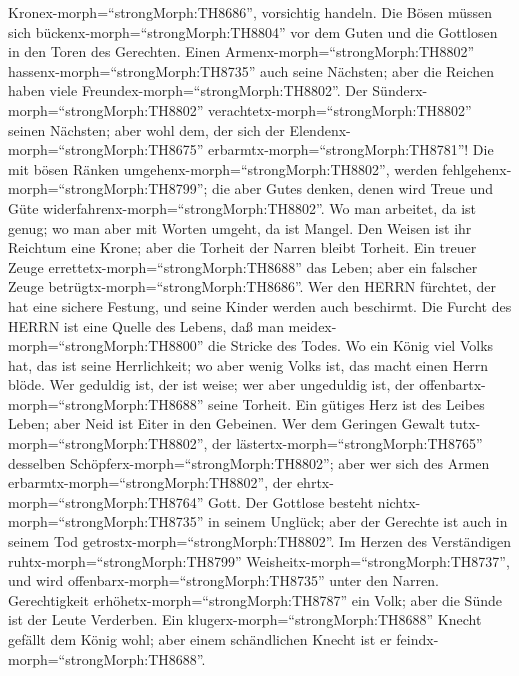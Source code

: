 Kronex-morph=``strongMorph:TH8686'', vorsichtig handeln. 
Die Bösen müssen sich bückenx-morph=``strongMorph:TH8804'' vor dem Guten
und die Gottlosen in den Toren des Gerechten.  Einen
Armenx-morph=``strongMorph:TH8802'' hassenx-morph=``strongMorph:TH8735''
auch seine Nächsten; aber die Reichen haben viele
Freundex-morph=``strongMorph:TH8802''.  Der
Sünderx-morph=``strongMorph:TH8802''
verachtetx-morph=``strongMorph:TH8802'' seinen Nächsten; aber wohl dem,
der sich der Elendenx-morph=``strongMorph:TH8675''
erbarmtx-morph=``strongMorph:TH8781''!  Die mit bösen
Ränken umgehenx-morph=``strongMorph:TH8802'', werden
fehlgehenx-morph=``strongMorph:TH8799''; die aber Gutes denken, denen
wird Treue und Güte widerfahrenx-morph=``strongMorph:TH8802''.
 Wo man arbeitet, da ist genug; wo man aber mit Worten
umgeht, da ist Mangel.  Den Weisen ist ihr Reichtum eine
Krone; aber die Torheit der Narren bleibt Torheit.  Ein
treuer Zeuge errettetx-morph=``strongMorph:TH8688'' das Leben; aber ein
falscher Zeuge betrügtx-morph=``strongMorph:TH8686''.  Wer
den HERRN fürchtet, der hat eine sichere Festung, und seine Kinder
werden auch beschirmt.  Die Furcht des HERRN ist eine
Quelle des Lebens, daß man meidex-morph=``strongMorph:TH8800'' die
Stricke des Todes.  Wo ein König viel Volks hat, das ist
seine Herrlichkeit; wo aber wenig Volks ist, das macht einen Herrn
blöde.  Wer geduldig ist, der ist weise; wer aber
ungeduldig ist, der offenbartx-morph=``strongMorph:TH8688'' seine
Torheit.  Ein gütiges Herz ist des Leibes Leben; aber Neid
ist Eiter in den Gebeinen.  Wer dem Geringen Gewalt
tutx-morph=``strongMorph:TH8802'', der
lästertx-morph=``strongMorph:TH8765'' desselben
Schöpferx-morph=``strongMorph:TH8802''; aber wer sich des Armen
erbarmtx-morph=``strongMorph:TH8802'', der
ehrtx-morph=``strongMorph:TH8764'' Gott.  Der Gottlose
besteht nichtx-morph=``strongMorph:TH8735'' in seinem Unglück; aber der
Gerechte ist auch in seinem Tod getrostx-morph=``strongMorph:TH8802''.
 Im Herzen des Verständigen
ruhtx-morph=``strongMorph:TH8799''
Weisheitx-morph=``strongMorph:TH8737'', und wird
offenbarx-morph=``strongMorph:TH8735'' unter den Narren. 
Gerechtigkeit erhöhetx-morph=``strongMorph:TH8787'' ein Volk; aber die
Sünde ist der Leute Verderben.  Ein
klugerx-morph=``strongMorph:TH8688'' Knecht gefällt dem König wohl; aber
einem schändlichen Knecht ist er feindx-morph=``strongMorph:TH8688''.

